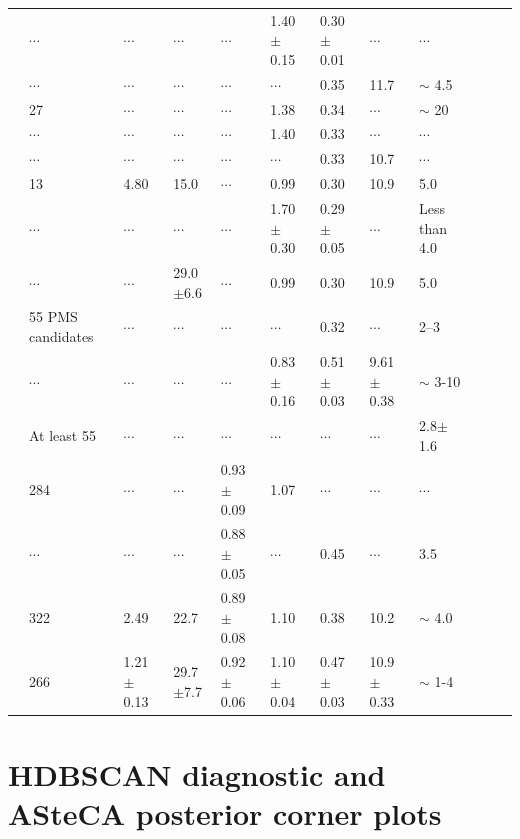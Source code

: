 \documentclass{aa}
\begin{document}
\begin{appendix}
\begin{table}
{\begin{tabular}{llllllllllll}
\citet{1985AA...151..391T} & $\cdots$ & $\cdots$ & $\cdots$ & $\cdots$ & 1.40$\pm$0.15 & 0.30$\pm$0.01 & $\cdots$ & $\cdots$\\
\citet{1989MNRAS.236..263P} & $\cdots$ & $\cdots$ & $\cdots$ & $\cdots$ & $\cdots$ & 0.35 & 11.7 & $\sim$ 4.5\\
\citet{1991MNRAS.249...76B} & 27 & $\cdots$ & $\cdots$ & $\cdots$ & 1.38 & 0.34 & $\cdots$ & $\sim$ 20\\
\citet{1994RMxAA..29..141F} & $\cdots$ & $\cdots$ & $\cdots$ & $\cdots$ & 1.40 & 0.33 & $\cdots$ & $\cdots$\\
\citet{2003AA...407..925R} & $\cdots$ & $\cdots$ & $\cdots$ & $\cdots$ & $\cdots$ & 0.33 & 10.7 & $\cdots$\\
\citet{2005AA...438.1163K} & 13 & 4.80 & 15.0 & $\cdots$ & 0.99 & 0.30 & 10.9 & 5.0\\
\citet{2007AA...462..157P} & $\cdots$ & $\cdots$ & $\cdots$ & $\cdots$ & 1.70$\pm$0.30 & 0.29$\pm$0.05 & $\cdots$ & Less than 4.0\\
\citet{2008AA...477..165P} & $\cdots$ & $\cdots$ & 29.0$\pm$6.6 & $\cdots$ & 0.99 & 0.30 & 10.9 & 5.0\\
\citet{2010AA...511A..25R} & 55 PMS candidates & $\cdots$ & $\cdots$ & $\cdots$ & $\cdots$ & 0.32 & $\cdots$ & 2--3\\
\citet{2018AA...610A..30A} & $\cdots$ & $\cdots$ & $\cdots$ & $\cdots$ & 0.83$\pm$0.16 & 0.51$\pm$0.03 & 9.61$\pm$0.38 & $\sim$ 3-10\\
\citet{2019MNRAS.484.5102K} & At least 55 & $\cdots$ & $\cdots$ & $\cdots$ & $\cdots$ & $\cdots$ & $\cdots$ & 2.8$\pm$1.6\\
\citet{2021ApJ...923..129J} & 284 & $\cdots$ & $\cdots$ & 0.93$\pm$0.09 & 1.07 & $\cdots$ & $\cdots$ & $\cdots$\\
\citet{2022ApJS..262....7H} & $\cdots$ & $\cdots$ & $\cdots$ & 0.88$\pm$0.05 & $\cdots$ & 0.45 & $\cdots$ & 3.5\\
\citet{2024arXiv240305143H} & 322 & 2.49 & 22.7 & 0.89$\pm$0.08 & 1.10 & 0.38 & 10.2 & $\sim$ 4.0\\
\citet{2024arXiv240301030P} & 266 & 1.21$\pm$0.13 & 29.7$\pm$7.7 & 0.92$\pm$0.06 & 1.10$\pm$0.04 & 0.47$\pm$0.03 & 10.9$\pm$0.33 & $\sim$ 1-4\\
\hline
\end{tabular}}
\end{table}

\section{HDBSCAN diagnostic and ASteCA posterior corner plots}


\end{appendix}
\end{document}

